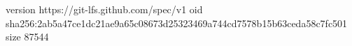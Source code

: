 version https://git-lfs.github.com/spec/v1
oid sha256:2ab5a47ce1dc21ae9a65c08673d25323469a744cd7578b15b63ceda58c7fc501
size 87544
